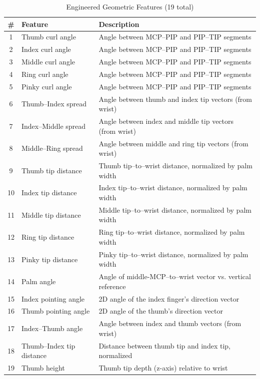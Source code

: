 \begin{table}[H]
\centering
\caption{Engineered Geometric Features (19 total)}
\label{tab:geometric_features}
\begin{tabular}{|c|l|l|}
\hline
\textbf{\#} & \textbf{Feature} & \textbf{Description} \\
\hline
1 & Thumb curl angle & Angle between MCP--PIP and PIP--TIP segments \\
\hline
2 & Index curl angle & Angle between MCP--PIP and PIP--TIP segments \\
\hline
3 & Middle curl angle & Angle between MCP--PIP and PIP--TIP segments \\
\hline
4 & Ring curl angle & Angle between MCP--PIP and PIP--TIP segments \\
\hline
5 & Pinky curl angle & Angle between MCP--PIP and PIP--TIP segments \\
\hline
6 & Thumb--Index spread & Angle between thumb and index tip vectors (from wrist) \\
\hline
7 & Index--Middle spread & Angle between index and middle tip vectors (from wrist) \\
\hline
8 & Middle--Ring spread & Angle between middle and ring tip vectors (from wrist) \\
\hline
9 & Thumb tip distance & Thumb tip--to--wrist distance, normalized by palm width \\
\hline
10 & Index tip distance & Index tip--to--wrist distance, normalized by palm width \\
\hline
11 & Middle tip distance & Middle tip--to--wrist distance, normalized by palm width \\
\hline
12 & Ring tip distance & Ring tip--to--wrist distance, normalized by palm width \\
\hline
13 & Pinky tip distance & Pinky tip--to--wrist distance, normalized by palm width \\
\hline
14 & Palm angle & Angle of middle-MCP--to--wrist vector vs. vertical reference \\
\hline
15 & Index pointing angle & 2D angle of the index finger's direction vector \\
\hline
16 & Thumb pointing angle & 2D angle of the thumb's direction vector \\
\hline
17 & Index--Thumb angle & Angle between index and thumb vectors (from wrist) \\
\hline
18 & Thumb--Index tip distance & Distance between thumb tip and index tip, normalized \\
\hline
19 & Thumb height & Thumb tip depth (z-axis) relative to wrist \\
\hline
\end{tabular}
\end{table}

